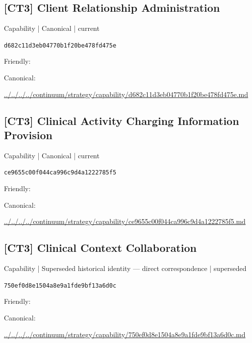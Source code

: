\documentclass[10pt,a4paper]{article}
\begin{document}
\subsection*{[CT3] Client Relationship Administration}
{\small Capability | Canonical | current}\par
\texttt{d682c11d3eb04770b1f20be478fd475e}\par
Friendly: \par
Canonical: \par
{\footnotesize\url{../../../../continuum/strategy/capability/d682c11d3eb04770b1f20be478fd475e.md}}\par
\subsection*{[CT3] Clinical Activity Charging Information Provision}
{\small Capability | Canonical | current}\par
\texttt{ce9655c00f044ca996c9d4a1222785f5}\par
Friendly: \par
Canonical: \par
{\footnotesize\url{../../../../continuum/strategy/capability/ce9655c00f044ca996c9d4a1222785f5.md}}\par
\subsection*{[CT3] Clinical Context Collaboration}
{\small Capability | Superseded historical identity — direct correspondence | superseded}\par
\texttt{750ef0d8e1504a8e9a1fde9bf13a6d0c}\par
Friendly: \par
Canonical: \par
{\footnotesize\url{../../../../continuum/strategy/capability/750ef0d8e1504a8e9a1fde9bf13a6d0c.md}}\par
\end{document}
